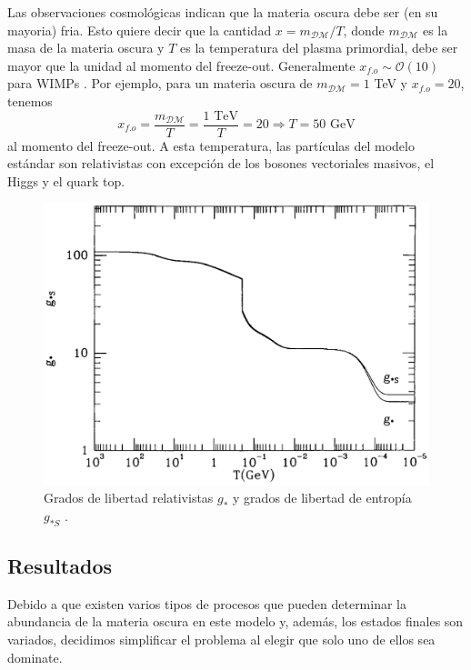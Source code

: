 Las observaciones cosmológicas indican que la materia oscura debe ser (en su mayoria) fria. Esto quiere decir que la cantidad $x=m_\mathcal{DM}/T$, donde $m_\mathcal{DM}$ es la masa de la materia oscura y $T$ es la temperatura del plasma primordial, debe ser mayor que la unidad al momento del freeze-out. Generalmente $x_{f.o}\sim \mathcal{O}(10)$ para WIMPs \cite{profumo2017introduction}. Por ejemplo, para un materia oscura de $m_\mathcal{DM}=1$ TeV y $x_{f.o}=20$, tenemos
\begin{equation}
x_{f.o}=\frac{m_\mathcal{DM}}{T} = \frac{1 \text{ TeV}}{T}=20 \Longrightarrow T = 50 \text{ GeV}
\end{equation}
al momento del freeze-out. A esta temperatura, las partículas del modelo estándar son relativistas con excepción de los bosones vectoriales masivos, el Higgs y el quark top.

\begin{figure}[h]
\centering
\includegraphics[scale=0.3]{Images/gstar.png}
\caption[\hspace{0.1in}Grados de libertad relativistas y de entropía]{Grados de libertad relativistas $g_*$ y grados de libertad de entropía $g_{*S}$ \cite{Kolb:1990vq}.}
\label{reldof}
\end{figure}


\newpage
\subsection[\hspace{-0.4in}) Resultados]{Resultados}

Debido a que existen varios tipos de procesos que pueden determinar la abundancia de la materia oscura en este modelo y, además, los estados finales son variados, decidimos simplificar el problema al elegir que solo uno de ellos sea dominate. 

